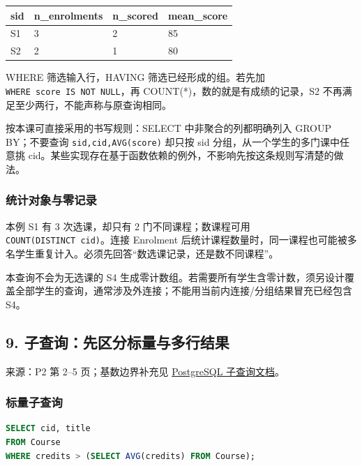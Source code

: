 \begin{longtable}[]{@{}llll@{}}
\toprule\noalign{}
sid & n\_enrolments & n\_scored & mean\_score \\
\midrule\noalign{}
\endhead
\bottomrule\noalign{}
\endlastfoot
S1 & 3 & 2 & 85 \\
S2 & 2 & 1 & 80 \\
\end{longtable}

WHERE 筛选输入行，HAVING 筛选已经形成的组。若先加 \texttt{WHERE\ score\ IS\ NOT\ NULL}，再 COUNT(*)，数的就是有成绩的记录，S2 不再满足至少两行，不能声称与原查询相同。

按本课可直接采用的书写规则：SELECT 中非聚合的列都明确列入 GROUP BY；不要查询 \texttt{sid,\allowbreak{}cid,\allowbreak{}AVG(\allowbreak{}score)\allowbreak{}} 却只按 sid 分组，从一个学生的多门课中任意挑 cid。某些实现存在基于函数依赖的例外，不影响先按这条规则写清楚的做法。

\subsubsection{统计对象与零记录}\label{06_sql_queries_zh-ux7edfux8ba1ux5bf9ux8c61ux4e0eux96f6ux8bb0ux5f55}

本例 S1 有 3 次选课，却只有 2 门不同课程；数课程可用 \texttt{COUNT(\allowbreak{}DISTINCT\ cid)\allowbreak{}}。连接 Enrolment 后统计课程数量时，同一课程也可能被多名学生重复计入。必须先回答``数选课记录，还是数不同课程''。

本查询不会为无选课的 S4 生成零计数组。若需要所有学生含零计数，须另设计覆盖全部学生的查询，通常涉及外连接；不能用当前内连接/分组结果冒充已经包含 S4。

\subsection{9. 子查询：先区分标量与多行结果}\label{06_sql_queries_zh-ux5b50ux67e5ux8be2ux5148ux533aux5206ux6807ux91cfux4e0eux591aux884cux7ed3ux679c}

来源：P2 第 2--5 页；基数边界补充见 \href{https://www.postgresql.org/docs/18/functions-subquery.html}{PostgreSQL 子查询文档}。

\subsubsection{标量子查询}\label{06_sql_queries_zh-ux6807ux91cfux5b50ux67e5ux8be2}

\Needspace{75pt}
\begin{lstlisting}[language=SQL]
SELECT cid, title
FROM Course
WHERE credits > (SELECT AVG(credits) FROM Course);
\end{lstlisting}


